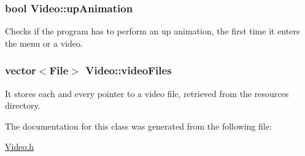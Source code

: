 \subsubsection[{\texorpdfstring{up\+Animation}{upAnimation}}]{\setlength{\rightskip}{0pt plus 5cm}bool Video\+::up\+Animation\hspace{0.3cm}{\ttfamily [private]}}\hypertarget{classVideo_a997f7ceb635d7897d2eed00cf6faaf19}{}\label{classVideo_a997f7ceb635d7897d2eed00cf6faaf19}
Checks if the program has to perform an up animation, the first time it enters the menu or a video. 
\subsubsection[{\texorpdfstring{video\+Files}{videoFiles}}]{\setlength{\rightskip}{0pt plus 5cm}vector$<${\bf File}$>$ Video\+::video\+Files\hspace{0.3cm}{\ttfamily [private]}}\hypertarget{classVideo_ae6b3a3fcfb9d7379aa39523a70dff6c7}{}\label{classVideo_ae6b3a3fcfb9d7379aa39523a70dff6c7}
It stores each and every pointer to a video file, retrieved from the resources directory. 

The documentation for this class was generated from the following file\+:\begin{DoxyCompactItemize}
\item 
\hyperlink{Video_8h}{Video.\+h}\end{DoxyCompactItemize}
